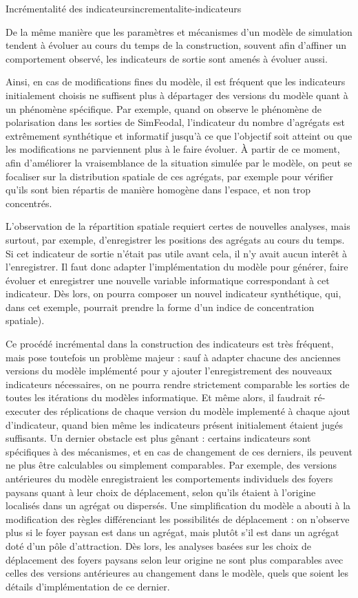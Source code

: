 \begin{encadre}{Incrémentalité des indicateurs}{incrementalite-indicateurs}

De la même manière que les paramètres et mécanismes d'un modèle de simulation tendent à évoluer\footnotemark{} au cours du temps de la construction, souvent afin d'affiner un comportement observé, les indicateurs de sortie sont amenés à évoluer aussi.

Ainsi, en cas de modifications fines du modèle, il est fréquent que les indicateurs initialement choisis ne suffisent plus à départager des versions du modèle quant à un phénomène spécifique.
Par exemple, quand on observe le phénomène de polarisation dans les sorties de SimFeodal, l'indicateur du nombre d'agrégats est extrêmement synthétique et informatif jusqu'à ce que l'objectif soit atteint ou que les modifications ne parviennent plus à le faire évoluer.
À partir de ce moment, afin d'améliorer la vraisemblance de la situation simulée par le modèle, on peut se focaliser sur la distribution spatiale de ces agrégats, par exemple pour vérifier qu'ils sont bien répartis de manière homogène dans l'espace, et non trop concentrés.

L'observation de la répartition spatiale requiert certes de nouvelles analyses, mais surtout, par exemple, d'enregistrer les positions des agrégats au cours du temps.
Si cet indicateur de sortie n'était pas utile avant cela, il n'y avait aucun interêt à l'enregistrer.
Il faut donc adapter l'implémentation du modèle pour générer, faire évoluer et enregistrer une nouvelle variable informatique correspondant à cet indicateur.
Dès lors, on pourra composer un nouvel indicateur synthétique, qui, dans cet exemple, pourrait prendre la forme d'un indice de concentration spatiale).

Ce procédé incrémental dans la construction des indicateurs est très fréquent, mais pose toutefois un problème majeur :
sauf à adapter chacune des anciennes versions du modèle implémenté pour y ajouter l'enregistrement des nouveaux indicateurs nécessaires, on ne pourra rendre strictement comparable les sorties de toutes les itérations du modèles informatique.
Et même alors, il faudrait ré-executer des réplications de chaque version du modèle implementé à chaque ajout d'indicateur, quand bien même les indicateurs présent initialement étaient jugés suffisants.
Un dernier obstacle est plus gênant :
certains indicateurs sont spécifiques à des mécanismes, et en cas de changement de ces derniers, ils peuvent ne plus être calculables ou simplement comparables.
Par exemple, des versions antérieures du modèle enregistraient les comportements individuels des foyers paysans quant à leur \og choix\fg{} de déplacement, selon qu'ils étaient à l'origine localisés dans un agrégat ou dispersés.
Une simplification du modèle a abouti à la modification des règles différenciant les possibilités de déplacement :
on n'observe plus si le foyer paysan est dans un agrégat, mais plutôt s'il est dans un agrégat doté d'un pôle d'attraction.
Dès lors, les analyses basées sur les choix de déplacement des foyers paysans selon leur origine ne sont plus comparables avec celles des versions antérieures au changement dans le modèle, quels que soient les détails d'implémentation de ce dernier.


\end{encadre}
